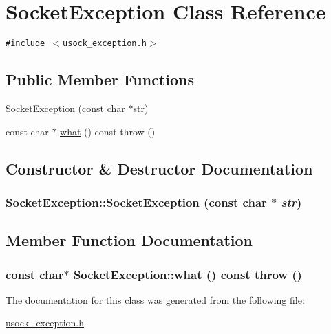 \hypertarget{classSocketException}{
\section{SocketException Class Reference}
\label{classSocketException}
}
{\tt \#include $<$usock\_\-exception.h$>$}

\subsection*{Public Member Functions}
\begin{CompactItemize}
\item 
\hyperlink{classSocketException_f439f2ef10e06643b4a40f4fbda853c1}{SocketException} (const char $\ast$str)
\item 
const char $\ast$ \hyperlink{classSocketException_ba95967e3d7a0496d831d9608f6ead97}{what} () const   throw ()
\end{CompactItemize}


\subsection{Constructor \& Destructor Documentation}
\hypertarget{classSocketException_f439f2ef10e06643b4a40f4fbda853c1}{
\subsubsection[{SocketException}]{\setlength{\rightskip}{0pt plus 5cm}SocketException::SocketException (const char $\ast$ {\em str})}}
\label{classSocketException_f439f2ef10e06643b4a40f4fbda853c1}




\subsection{Member Function Documentation}
\hypertarget{classSocketException_ba95967e3d7a0496d831d9608f6ead97}{
\subsubsection[{what}]{\setlength{\rightskip}{0pt plus 5cm}const char$\ast$ SocketException::what () const  throw ()}}
\label{classSocketException_ba95967e3d7a0496d831d9608f6ead97}




The documentation for this class was generated from the following file:\begin{CompactItemize}
\item 
\hyperlink{usock__exception_8h}{usock\_\-exception.h}\end{CompactItemize}
